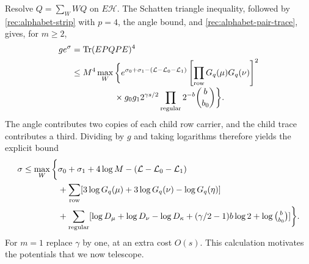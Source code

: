 Resolve $Q=\sum_W WQ$ on $E\mathcal H$.  The Schatten triangle
inequality, followed by \eqref{rec:alphabet-strip} with $p=4$,
the angle bound, and \eqref{rec:alphabet-pair-trace}, gives, for $m\ge2$,
\begin{align}
 g e^\sigma
 &=\operatorname{Tr}(EPQPE)^4\notag\\
 &\le M^4\max_W\bigg\{
 e^{\sigma_0+\sigma_1-(\mathcal L-\mathcal L_0-\mathcal L_1)}
 \left[\prod_{\mathrm{row}}G_q(\mu)G_q(\nu)\right]^2
 \notag\\[-2pt]
 &\hspace{5em}{}\times g_0g_1 2^{\gamma s/2}
 \prod_{\mathrm{regular}}2^{-b}\binom b{b_0}\bigg\}.
 \label{rec:alphabet-master-split}
\end{align}
The angle contributes two copies of each child row carrier, and the
child trace contributes a third.  Dividing by $g$ and taking logarithms
therefore yields the explicit bound
\begin{align*}
 \sigma\le\max_W\bigg\{&\sigma_0+\sigma_1+4\log M
      -(\mathcal L-\mathcal L_0-\mathcal L_1)\\
 &+\sum_{\mathrm{row}}
       [3\log G_q(\mu)+3\log G_q(\nu)-\log G_q(\eta)]\\
 &+\sum_{\mathrm{regular}}
       [\log D_\mu+\log D_\nu-\log D_\kappa
          +(\gamma/2-1)b\log2+\log\tbinom b{b_0}]
 \bigg\}.
\end{align*}
For $m=1$ replace $\gamma$ by one, at an extra cost $O(s)$.
This calculation motivates the potentials that we now telescope.


